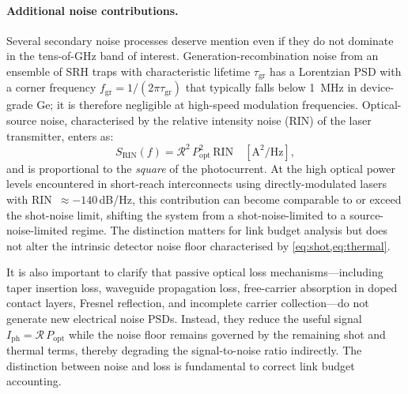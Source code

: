 \paragraph{Additional noise contributions.}
Several secondary noise processes deserve mention even if they do not dominate
in the \mbox{tens-of-GHz} band of interest. Generation-recombination noise
from an ensemble of SRH traps with characteristic lifetime $\tau_{\mathrm{gr}}$
has a Lorentzian PSD with a corner frequency $f_{\mathrm{gr}} = 1/(2\pi\tau_{\mathrm{gr}})$
that typically falls below \SI{1}{\mega\hertz} in device-grade Ge; it is
therefore negligible at high-speed modulation frequencies. Optical-source noise,
characterised by the relative intensity noise (RIN) of the laser transmitter,
enters as:
\begin{equation}
    S_{\mathrm{RIN}}(f) = \mathcal{R}^2\,P_{\mathrm{opt}}^2\,\mathrm{RIN}
    \quad [\si{\ampere\squared\per\hertz}],
    \label{eq:rin_noise}
\end{equation}
and is proportional to the \emph{square} of the photocurrent. At the high optical
power levels encountered in short-reach interconnects using directly-modulated
lasers with RIN~$\approx -140$\,dB/Hz, this contribution can become comparable
to or exceed the shot-noise limit, shifting the system from a shot-noise-limited
to a source-noise-limited regime. The distinction matters for link budget
analysis but does not alter the intrinsic detector noise floor characterised
by \cref{eq:shot,eq:thermal}.

It is also important to clarify that passive optical loss mechanisms---including
taper insertion loss, waveguide propagation loss, free-carrier absorption in
doped contact layers, Fresnel reflection, and incomplete carrier
collection---do not generate new electrical noise PSDs. Instead, they reduce the
useful signal $I_{\mathrm{ph}} = \mathcal{R}\,P_{\mathrm{opt}}$ while the noise
floor remains governed by the remaining shot and thermal terms, thereby degrading
the signal-to-noise ratio indirectly. The distinction between noise and loss is
fundamental to correct link budget accounting.

